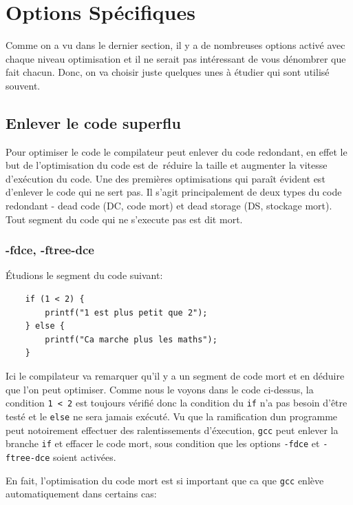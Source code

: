 \documentclass[11pt]{article} %
\begin{document}
\section*{Options Sp\'ecifiques}
Comme on a vu dans le dernier section, il y a de nombreuses options activ\'e avec chaque niveau optimisation et il ne serait pas int\'eressant
de vous d\'enombrer que fait chacun. Donc, on va choisir juste quelques unes \`a \'etudier qui sont utilis\'e souvent.

\subsection*{Enlever le code superflu}
Pour optimiser le code le compilateur peut enlever du code redondant, en effet le but de l’optimisation du code est de réduire la taille et augmenter la vitesse d’exécution du code.
Une des premières optimisations qui paraît évident est d’enlever le code qui ne sert pas. Il s'agit principalement de deux types du code redondant - dead code (DC, code mort) et dead storage (DS, stockage mort).
Tout segment du code qui ne s'execute pas est dit mort.


\subsubsection*{-fdce, -ftree-dce}

\'Etudions le segment du code suivant:
\begin{verbatim}
    if (1 < 2) {
        printf("1 est plus petit que 2");
    } else {
        printf("Ca marche plus les maths");
    }
\end{verbatim}

Ici le compilateur va remarquer qu'il y a un segment de code mort et en d\'eduire que l'on peut optimiser.
Comme nous le voyons dans le code ci-dessus, la condition \verb|1 < 2| est toujours v\'erifi\'e donc la condition du \verb|if| n’a pas
besoin d’être testé et le \verb|else| ne sera jamais exécuté. Vu que la ramification dun programme peut notoirement effectuer des
ralentissements d'\'execution, \verb|gcc| peut enlever la branche \verb|if| et effacer le code mort, sous condition que les options \verb|-fdce| et
\verb|-ftree-dce| soient activ\'ees.

En fait, l'optimisation du code mort est si important que ca que \verb|gcc| enl\`eve automatiquement dans certains cas:
\end{document}
